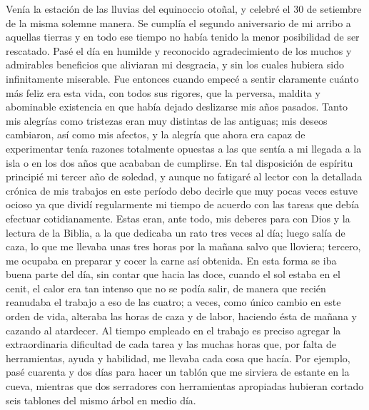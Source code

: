 \documentclass{novela}
\begin{document}
    Venía la estación de las lluvias del equinoccio otoñal, y celebré el 30 de setiembre de la misma solemne manera. Se cumplía el segundo aniversario de mi arribo a aquellas tierras y en todo ese tiempo no había tenido la menor posibilidad de ser rescatado. Pasé el día en humilde y reconocido agradecimiento de los muchos y admirables beneficios que aliviaran mi desgracia, y sin los cuales hubiera sido infinitamente miserable.
    Fue entonces cuando empecé a sentir claramente cuánto más feliz era esta vida, con todos sus rigores, que la perversa, maldita y abominable existencia en que había dejado deslizarse mis años pasados. Tanto mis alegrías como tristezas eran muy distintas de las antiguas; mis deseos cambiaron, así como mis afectos, y la alegría que ahora era capaz de experimentar tenía razones totalmente opuestas a las que sentía a mi llegada a la isla o en los dos años que acababan de cumplirse.
    En tal disposición de espíritu principié mi tercer año de soledad, y aunque no fatigaré al lector con la detallada crónica de mis trabajos en este período debo decirle que muy pocas veces estuve ocioso ya que dividí regularmente mi tiempo de acuerdo con las tareas que debía efectuar cotidianamente. Estas eran, ante todo, mis deberes para con Dios y la lectura de la Biblia, a la que dedicaba un rato tres veces al día; luego salía de caza, lo que me llevaba unas tres horas por la mañana salvo que lloviera; tercero, me ocupaba en preparar y cocer la carne así obtenida. En esta forma se iba buena parte del día, sin contar que hacia las doce, cuando el sol estaba en el cenit, el calor era tan intenso que no se podía salir, de manera que recién reanudaba el trabajo a eso de las cuatro; a veces, como único cambio en este orden de vida, alteraba las horas de caza y de labor, haciendo ésta de mañana y cazando al atardecer.
    Al tiempo empleado en el trabajo es preciso agregar la extraordinaria dificultad de cada tarea y las muchas horas que, por falta de herramientas, ayuda y habilidad, me llevaba cada cosa que hacía. Por ejemplo, pasé cuarenta y dos días para hacer un tablón que me sirviera de estante en la cueva, mientras que dos serradores con herramientas apropiadas hubieran cortado seis tablones del mismo árbol en medio día.
\end{document}
